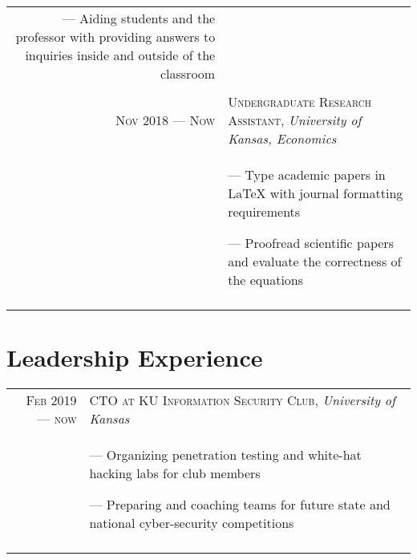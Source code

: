 \documentclass[letterpaper,10pt]{article}
\begin{document}
\begin{tabular}{r|p{11cm}}
{    --- Aiding students and the professor with providing answers to inquiries inside and outside of the classroom
  } \\\multicolumn{2}{c}{}\\
  
  
      \textsc{Nov 2018 --- Now} &  \textsc{Undergraduate Research Assistant}, \emph{University of Kansas, Economics}\\&\footnotesize{
  --- Type academic papers in \LaTeX{} with journal formatting requirements

  --- Proofread scientific papers and evaluate the correctness of the equations
  } \\\multicolumn{2}{c}{}\\
  \end{tabular}

\section{Leadership Experience}
\begin{tabular}{r|p{11cm}}
  \textsc{Feb 2019 --- now} &  \textsc{CTO at KU Information Security Club}, \emph{University of Kansas}\\&\footnotesize{
    --- Organizing penetration testing and white-hat hacking labs for club members
    
    
    --- Preparing and coaching teams for future state and national cyber-security competitions
  } \\\multicolumn{2}{c}{}\\
\end{tabular}
\end{document}
